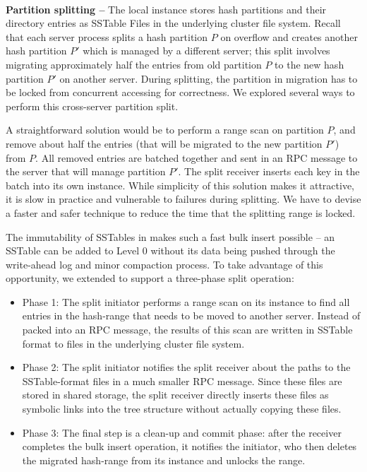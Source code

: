 ~\\
\textbf{Partition splitting -- }
The local \tfs instance stores \giga hash partitions and their directory
entries as SSTable Files in the underlying cluster file system.
Recall that each \giga server process splits a hash partition $P$ on
overflow and creates another hash partition $P'$ which is managed by a
different server; this split involves migrating approximately half the entries
from old partition $P$ to the new hash partition $P'$ on another server.
During splitting, the partition in migration has to be locked from
concurrent accessing for correctness.
We explored several ways to perform this cross-server partition split.

A straightforward solution would be to perform a range scan on
partition $P$, and remove about half the entries
(that will be migrated to the new partition $P'$) from $P$.
All removed entries are batched together
and sent in an RPC message to the server that will manage partition $P'$.
The split receiver inserts each key in the batch into its own \tfs instance.
While simplicity of this solution makes it attractive,
it is slow in practice and vulnerable to failures during splitting.
We have to devise a faster and safer technique to
reduce the time that the splitting range is locked.

The immutability of SSTables in \ldb makes such a fast bulk insert possible --
an SSTable can be added to Level 0 without its data being pushed through the
write-ahead log and minor compaction process.
To take advantage of this opportunity, we extended \tfs
to support a three-phase split operation:

\begin{itemize}
\item{Phase 1:} The split initiator performs a range scan on its \tfs instance
to find all entries in the hash-range that needs to be moved to another server.
Instead of packed into an RPC message,
the results of this scan are written in SSTable format to files in the
underlying cluster file system.

\item{Phase 2:} The split initiator notifies the split receiver about
the paths to the SSTable-format files in a much smaller RPC message.
Since these files are stored in shared storage,
the split receiver directly inserts these files as symbolic links
into the \ldb tree structure without actually copying these files.

\item{Phase 3:} The final step is a clean-up and commit phase:
after the receiver completes the bulk insert operation, it notifies the
initiator, who then deletes the migrated hash-range from its \tfs instance
and unlocks the range.
\end{itemize}


